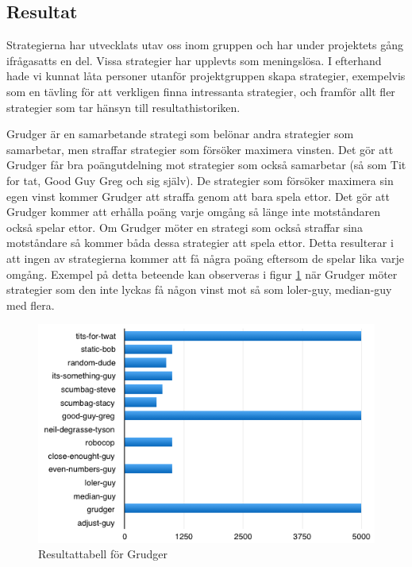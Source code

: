 \subsection{Resultat}
Strategierna har utvecklats utav oss inom gruppen och har under projektets gång ifrågasatts en del. Vissa strategier har upplevts som meningslösa. I efterhand hade vi kunnat låta personer utanför projektgruppen skapa strategier, exempelvis som en tävling för att verkligen finna intressanta strategier, och framför allt fler strategier som tar hänsyn till resultathistoriken.

Grudger är en samarbetande strategi som belönar andra strategier som samarbetar, men straffar strategier som försöker maximera vinsten. Det gör att Grudger får bra poängutdelning mot strategier som också samarbetar (så som Tit for tat, Good Guy Greg och sig själv). De strategier som försöker maximera sin egen vinst kommer Grudger att straffa genom att bara spela ettor. Det gör att Grudger kommer att erhålla poäng varje omgång så länge inte motståndaren också spelar ettor. Om Grudger möter en strategi som också straffar sina motståndare så kommer båda dessa strategier att spela ettor. Detta resulterar i att ingen av strategierna kommer att få några poäng eftersom de spelar lika varje omgång. Exempel på detta beteende kan observeras i figur \ref{grudger} när Grudger möter strategier som den inte lyckas få någon vinst mot så som loler-guy, median-guy med flera. 

\begin{figure}[H]
	\begin{center}
	\includegraphics[scale=0.75, angle=0]{bilder/grudger.png}
	\caption{Resultattabell för Grudger}
	\label{grudger}
	\end{center}
\end{figure}

